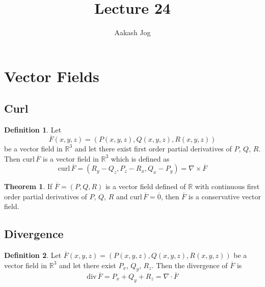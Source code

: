 \documentclass[fleqn, a4paper, 12pt]{article}
\title{Lecture 24}
\author{Aakash Jog}
\date{\formatdate{20}{1}{2015}}
\newcommand{\curl}{\mathrm{curl\,}}
\newcommand{\divergence}{\mathrm{div\,}}
\theoremstyle{definition}
\newtheorem{definition}{Definition}
\theoremstyle{theorem}
\newtheorem{theorem}{Theorem}
\theoremstyle{remark}
\begin{document}
	
\maketitle

\tableofcontents

\newpage

\section{Vector Fields}

\subsection{Curl}

\begin{definition}
	Let
	\begin{equation*}
		\overline{F}(x,y,z) = \left( P(x,y,z), Q(x,y,z), R(x,y,z) \right)
	\end{equation*}
	be a vector field in $\mathbb{R}^3$ and let there exist first order partial derivatives of $P$, $Q$, $R$. Then $\curl \overline{F}$ is a vector field in $\mathbb{R}^3$ which is defined as
	\begin{equation*}
		\curl \overline{F} = (R_y - Q_z, P_z - R_x, Q_x - P_y) = \nabla \times \overline{F}
	\end{equation*}
\end{definition}

\begin{theorem}
	If $\overline{F} = (P, Q, R)$ is a vector field defined of $\mathbb{R}$ with continuous first order partial derivatives of $P$, $Q$, $R$ and $\curl \overline{F} = \overline{0}$, then $\overline{F}$ is a conservative vector field. 
\end{theorem}

\subsection{Divergence}

\begin{definition}
	Let $\overline{F}(x,y,z) = \left( P(x,y,z), Q(x,y,z), R(x,y,z) \right)$ be a vector field in $\mathbb{R}^3$ and let there exist $P_x$, $Q_y$, $R_z$. Then the divergence of $\overline{F}$ is
	\begin{equation*}
		\divergence \overline{F} = P_x + Q_y + R_z = \nabla \cdot \overline{F}
	\end{equation*}
\end{definition}
\end{document}
